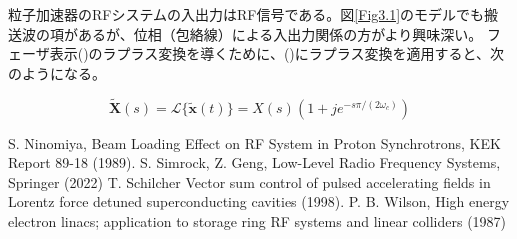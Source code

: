 \documentclass[book]{jlreq}
\begin{document}
粒子加速器のRFシステムの入出力はRF信号である。図\ref{Fig3.1}のモデルでも搬送波の項があるが、位相（包絡線）による入出力関係の方がより興味深い。
フェーザ表示()のラプラス変換を導くために、()にラプラス変換を適用すると、次のようになる。

\begin{equation}
    \tilde{\bm{X}}(s) = \mathcal{L}\{\tilde{\bm{x}}(t)\} = X(s)\left( 1+j e^{-s\pi / (2\omega_c)}\right)
\end{equation}

%
\begin{thebibliography}{9}
    S. Ninomiya, Beam Loading Effect on RF System in Proton Synchrotrons, KEK Report 89-18 (1989).
    S. Simrock, Z. Geng, Low-Level Radio Frequency Systems, Springer (2022)
    T. Schilcher Vector sum control of pulsed accelerating fields in Lorentz force detuned superconducting cavities (1998).
    P. B. Wilson, High energy electron linacs; application to storage ring RF systems and linear colliders (1987)
\end{thebibliography}
%
%
\end{document}
